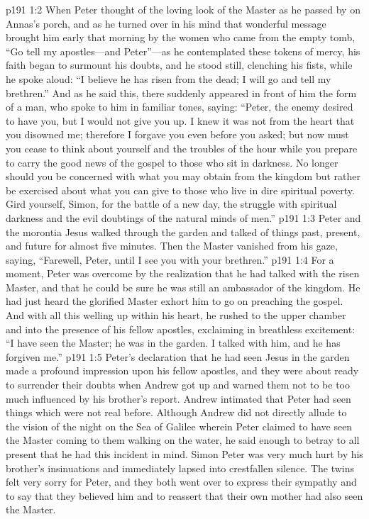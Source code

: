 \vs p191 1:2 When Peter thought of the loving look of the Master as he passed by on Annas’s porch, and as he turned over in his mind that wonderful message brought him early that morning by the women who came from the empty tomb, \textcolor{ubdarkred}{“Go tell my apostles---and Peter”}---as he contemplated these tokens of mercy, his faith began to surmount his doubts, and he stood still, clenching his fists, while he spoke aloud: “I believe he has risen from the dead; I will go and tell my brethren.” And as he said this, there suddenly appeared in front of him the form of a man, who spoke to him in familiar tones, saying: \textcolor{ubdarkred}{“Peter, the enemy desired to have you, but I would not give you up. I knew it was not from the heart that you disowned me; therefore I forgave you even before you asked; but now must you cease to think about yourself and the troubles of the hour while you prepare to carry the good news of the gospel to those who sit in darkness. No longer should you be concerned with what you may obtain from the kingdom but rather be exercised about what you can give to those who live in dire spiritual poverty. Gird yourself, Simon, for the battle of a new day, the struggle with spiritual darkness and the evil doubtings of the natural minds of men.”}
\vs p191 1:3 Peter and the morontia Jesus walked through the garden and talked of things past, present, and future for almost five minutes. Then the Master vanished from his gaze, saying, \textcolor{ubdarkred}{“Farewell, Peter, until I see you with your brethren.”}
\vs p191 1:4 For a moment, Peter was overcome by the realization that he had talked with the risen Master, and that he could be sure he was still an ambassador of the kingdom. He had just heard the glorified Master exhort him to go on preaching the gospel. And with all this welling up within his heart, he rushed to the upper chamber and into the presence of his fellow apostles, exclaiming in breathless excitement: “I have seen the Master; he was in the garden. I talked with him, and he has forgiven me.”
\vs p191 1:5 Peter’s declaration that he had seen Jesus in the garden made a profound impression upon his fellow apostles, and they were about ready to surrender their doubts when Andrew got up and warned them not to be too much influenced by his brother’s report. Andrew intimated that Peter had seen things which were not real before. Although Andrew did not directly allude to the vision of the night on the Sea of Galilee wherein Peter claimed to have seen the Master coming to them walking on the water, he said enough to betray to all present that he had this incident in mind. Simon Peter was very much hurt by his brother’s insinuations and immediately lapsed into crestfallen silence. The twins felt very sorry for Peter, and they both went over to express their sympathy and to say that they believed him and to reassert that their own mother had also seen the Master.
